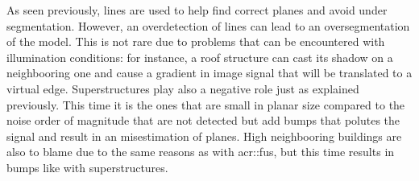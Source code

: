                 \begin{figure}[H]
                    \centering
                \end{figure}

                As seen previously, lines are used to help find correct planes and avoid under segmentation.
                However, an overdetection of lines can lead to an oversegmentation of the model.
                This is not rare due to problems that can be encountered with illumination conditions: for instance, a roof structure can cast its shadow on a neighbooring one and cause a gradient in image signal that will be translated to a virtual edge.
                Superstructures play also a negative role just as explained previously.
                This time it is the ones that are small in planar size compared to the noise order of magnitude that are not detected but add bumps that polutes the signal and result in an misestimation of planes.
                High neighbooring buildings are also to blame due to the same reasons as with \gls{acr::fus}, but this time results in bumps like with superstructures.\\


